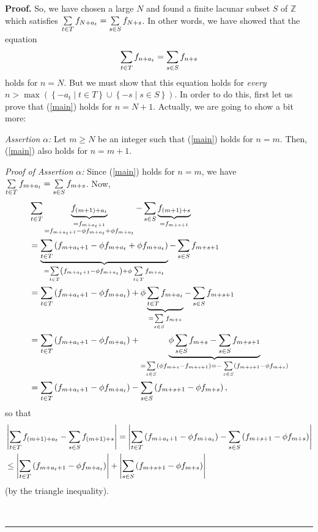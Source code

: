 \documentclass[numbers=enddot,12pt,final,onecolumn,notitlepage]{scrartcl}%
\numberwithin{exer}{section}
\theoremstyle{definition}
\newenvironment{proof}[1][Proof]{\noindent\textbf{#1.} }{\ \rule{0.5em}{0.5em}}
\let\sumnonlimits\sum
\renewcommand{\sum}{\sumnonlimits\limits}
\begin{document}
\begin{proof}
So, we have chosen a large $N$ and found a finite lacunar subset $S$ of
$\mathbb{Z}$ which satisfies $\sum\limits_{t\in T}f_{N+a_{t}}=\sum
\limits_{s\in S}f_{N+s}$. In other words, we have showed that the equation
\begin{equation}
\sum\limits_{t\in T}f_{n+a_{t}}=\sum\limits_{s\in S}f_{n+s} \label{main}%
\end{equation}
holds for $n=N$. But we must show that this equation holds for \textit{every}
$n>\max\left(  \left\{  -a_{t}\mid t\in T\right\}  \cup\left\{  -s\mid s\in
S\right\}  \right)  $. In order to do this, first let us prove that
(\ref{main}) holds for $n=N+1$. Actually, we are going to show a bit more:

\textit{Assertion }$\alpha$\textit{:} Let $m\geq N$ be an integer such that
(\ref{main}) holds for $n=m$. Then, (\ref{main}) also holds for $n=m+1$.

\textit{Proof of Assertion }$\alpha$\textit{:} Since (\ref{main}) holds for
$n=m$, we have $\sum\limits_{t\in T}f_{m+a_{t}}=\sum\limits_{s\in S}f_{m+s}$.
Now,%
\begin{align*}
&  \sum\limits_{t\in T}\underbrace{f_{\left(  m+1\right)  +a_{t}}%
}_{\substack{=f_{m+a_{t}+1}\\=f_{m+a_{t}+1}-\phi f_{m+a_{t}}+\phi f_{m+a_{t}}%
}}-\sum\limits_{s\in S}\underbrace{f_{\left(  m+1\right)  +s}}_{=f_{m+s+1}}\\
&  =\underbrace{\sum\limits_{t\in T}\left(  f_{m+a_{t}+1}-\phi f_{m+a_{t}%
}+\phi f_{m+a_{t}}\right)  }_{=\sum\limits_{t\in T}\left(  f_{m+a_{t}+1}-\phi
f_{m+a_{t}}\right)  +\phi\sum\limits_{t\in T}f_{m+a_{t}}}-\sum\limits_{s\in
S}f_{m+s+1}\\
&  =\sum\limits_{t\in T}\left(  f_{m+a_{t}+1}-\phi f_{m+a_{t}}\right)
+\phi\underbrace{\sum\limits_{t\in T}f_{m+a_{t}}}_{=\sum\limits_{s\in
S}f_{m+s}}-\sum\limits_{s\in S}f_{m+s+1}\\
&  =\sum\limits_{t\in T}\left(  f_{m+a_{t}+1}-\phi f_{m+a_{t}}\right)
+\underbrace{\phi\sum\limits_{s\in S}f_{m+s}-\sum\limits_{s\in S}f_{m+s+1}%
}_{=\sum\limits_{s\in S}\left(  \phi f_{m+s}-f_{m+s+1}\right)  =-\sum
\limits_{s\in S}\left(  f_{m+s+1}-\phi f_{m+s}\right)  }\\
&  =\sum\limits_{t\in T}\left(  f_{m+a_{t}+1}-\phi f_{m+a_{t}}\right)
-\sum\limits_{s\in S}\left(  f_{m+s+1}-\phi f_{m+s}\right)  ,
\end{align*}
so that%
\begin{align}
&  \left\vert \sum\limits_{t\in T}f_{\left(  m+1\right)  +a_{t}}%
-\sum\limits_{s\in S}f_{\left(  m+1\right)  +s}\right\vert =\left\vert
\sum\limits_{t\in T}\left(  f_{m+a_{t}+1}-\phi f_{m+a_{t}}\right)
-\sum\limits_{s\in S}\left(  f_{m+s+1}-\phi f_{m+s}\right)  \right\vert
\nonumber\\
&  \leq\left\vert \sum\limits_{t\in T}\left(  f_{m+a_{t}+1}-\phi f_{m+a_{t}%
}\right)  \right\vert +\left\vert \sum\limits_{s\in S}\left(  f_{m+s+1}-\phi
f_{m+s}\right)  \right\vert \label{Estimate1}%
\end{align}
(by the triangle inequality).


\end{proof}
\end{document}
